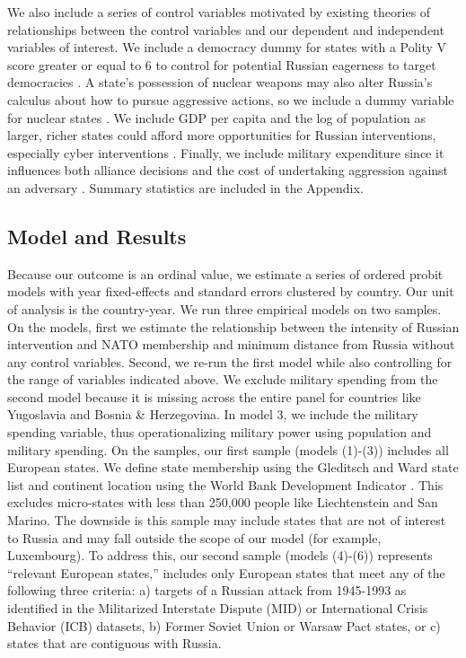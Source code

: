 \documentclass[11pt,letterpaper,pdftex,dvipsnames,table]{article}
\begin{document}
We also include a series of control variables motivated by existing theories of relationships between the control variables and our dependent and independent variables of interest. We include a democracy dummy for states with a Polity V score greater or equal to 6 to control for potential Russian eagerness to target democracies \citep{early_nuclearweaponsexistential_2018}. A state's possession of nuclear weapons may also alter Russia's calculus about how to pursue aggressive actions, so we include a dummy variable for nuclear states \citep{gartzke_strategicapproachnuclear_2009}. We include GDP per capita and the log of population as larger, richer states could afford more opportunities for Russian interventions, especially cyber interventions \citep{beckley_economicdevelopmentmilitary_2010}. Finally, we include military expenditure since it influences both alliance decisions and the cost of undertaking aggression against an adversary \citep{omitoogun_militaryexpendituredata_2006}. Summary statistics are included in the Appendix.

\subsection{Model and Results}
Because our outcome is an ordinal value, we estimate a series of ordered probit models with year fixed-effects and standard errors clustered by country. Our unit of analysis is the country-year. We run three empirical models on two samples. On the models, first we estimate the relationship between the intensity of Russian intervention and NATO membership and minimum distance from Russia without any control variables. Second, we re-run the first model  while also controlling for the range of variables indicated above. We exclude military spending from the second model because it is missing across the entire panel for countries like Yugoslavia and Bosnia \& Herzegovina. In model 3, we include the military spending variable, thus operationalizing military power using population and military spending. On the samples, our first sample (models (1)-(3)) includes all European states. We define state membership using the Gleditsch and Ward state list and continent location using the World Bank Development Indicator \citep{gleditsch_revisedlistindependent_1999}. This excludes micro-states with less than 250,000 people like Liechtenstein and San Marino. The downside is this sample may include states that are not of interest to Russia and may fall outside the scope of our model (for example, Luxembourg). To address this, our second sample (models (4)-(6)) represents ``relevant European states,'' includes only European states that meet any of the following three criteria: a) targets of a Russian attack from 1945-1993 as identified in the Militarized Interstate Dispute (MID) or International Crisis Behavior (ICB) datasets, b) Former Soviet Union or Warsaw Pact states, or c) states that are contiguous with Russia.
\end{document}
